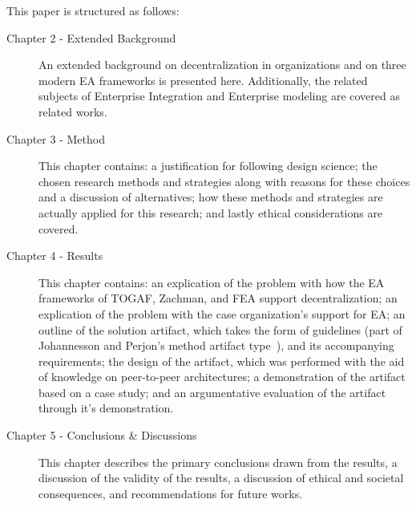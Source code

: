 This paper is structured as follows:
\begin{description}
  \item[Chapter 2 - Extended Background] An extended background on decentralization in organizations and on three modern EA frameworks is presented here. Additionally, the related subjects of Enterprise Integration and Enterprise modeling are covered as related works. 
  \item[Chapter 3 - Method] This chapter contains: a justification for following design science; the chosen research methods and strategies along with reasons for these choices and a discussion of alternatives; how these methods and strategies are actually applied for this research; and lastly ethical considerations are covered. 
  \item[Chapter 4 - Results] This chapter contains: an explication of the problem with how the EA frameworks of TOGAF, Zachman, and FEA support decentralization; an explication of the problem with the case organization's support for EA; an outline of the solution artifact, which takes the form of guidelines (part of Johannesson and Perjon's method artifact type~\cite[Ch. 2.4]{johannessonPerjons2012}), and its accompanying requirements; the design of the artifact, which was performed with the aid of knowledge on peer-to-peer architectures; a demonstration of the artifact based on a case study; and an argumentative evaluation of the artifact through it's demonstration.
  \item[Chapter 5 - Conclusions \& Discussions] This chapter describes the primary conclusions drawn from the results, a discussion of the validity of the results, a discussion of ethical and societal consequences, and recommendations for future works. 
\end{description}